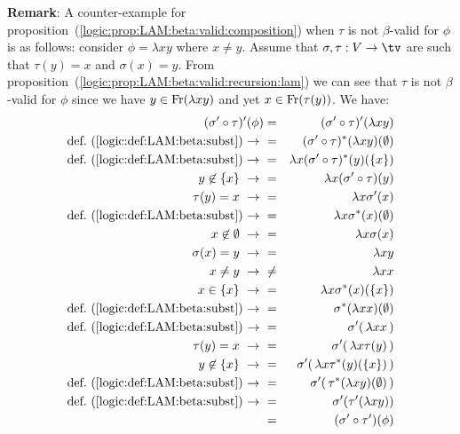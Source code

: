 \noindent
{\bf Remark}: A counter-example for
proposition~(\ref{logic:prop:LAM:beta:valid:composition}) when $\tau$ is not
$\beta$-valid for $\phi$ is as follows: consider $\phi=\lambda x y$ where
$x\neq y$. Assume that $\sigma,\tau:V\to\tv$ are such that
$\tau(y)=x$ and $\sigma(x)=y$. From
proposition~(\ref{logic:prop:LAM:beta:valid:recursion:lam}) we can see that
$\tau$ is not $\beta$-valid for $\phi$ since we have $y\in\mbox{\rm Fr}(\lambda x y)$
and yet $x\in\mbox{\rm Fr}(\tau(y))$. We have:
    \begin{eqnarray*}(\sigma'\circ\tau)' (\phi)
        &=&(\sigma'\circ\tau)' (\lambda x y)\\
        \mbox{def.~(\ref{logic:def:LAM:beta:subst})\ $\to$\ }
        &=&(\sigma'\circ\tau)^{*} (\lambda x y)(\emptyset)\\
        \mbox{def.~(\ref{logic:def:LAM:beta:subst})\ $\to$\ }
        &=&\lambda x(\sigma'\circ\tau)^{*} (y)(\{x\})\\
        y\not\in\{x\}\ \to\ 
        &=&\lambda x(\sigma'\circ\tau) (y)\\
        \tau(y)=x\ \to\ 
        &=&\lambda x\sigma'(x)\\
        \mbox{def.~(\ref{logic:def:LAM:beta:subst})\ $\to$\ }
        &=&\lambda x\sigma^{*}(x)(\emptyset)\\
        x\not\in\emptyset\ \to\ 
        &=&\lambda x\sigma(x)\\
        \sigma(x)=y\ \to\ 
        &=&\lambda x y\\
        x\neq y\ \to\ 
        &\neq&\lambda x x\\
        x\in\{x\}\ \to\ 
        &=&\lambda x \sigma^{*}(x)(\{x\})\\
        \mbox{def.~(\ref{logic:def:LAM:beta:subst})\ $\to$\ }
        &=&\sigma^{*}(\lambda x x)(\emptyset)\\
        \mbox{def.~(\ref{logic:def:LAM:beta:subst})\ $\to$\ }
        &=&\sigma'(\,\lambda x x\,)\\
        \tau(y)=x\ \to\ 
        &=&\sigma'(\,\lambda x\tau(y)\,)\\
        y\not\in\{x\}\ \to\ 
        &=&\sigma'(\,\lambda x\tau^{*}(y)(\{x\})\,)\\
        \mbox{def.~(\ref{logic:def:LAM:beta:subst})\ $\to$\ }
        &=&\sigma'(\,\tau^{*}(\lambda x y)(\emptyset)\,)\\
        \mbox{def.~(\ref{logic:def:LAM:beta:subst})\ $\to$\ }
        &=&\sigma'(\tau'(\lambda x y))\\
        &=&(\sigma'\circ\tau')(\phi)
    \end{eqnarray*}

